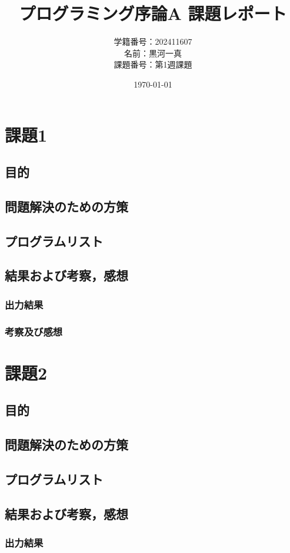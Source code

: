 \documentclass[a4paper]{ltjsarticle}
\title{プログラミング序論A 課題レポート}
\author{学籍番号：202411607\\名前：黒河一真\\課題番号：第1週課題}
\date{\today}
\begin{document}
\maketitle

\section{課題1}
\subsection{目的}
\subsection{問題解決のための方策}
\subsection{プログラムリスト}
\subsection{結果および考察，感想}
\subsubsection{出力結果}
\subsubsection{考察及び感想}
\section{課題2}
\subsection{目的}
\subsection{問題解決のための方策}
\subsection{プログラムリスト}
\subsection{結果および考察，感想}
\subsubsection{出力結果}
\end{document}
